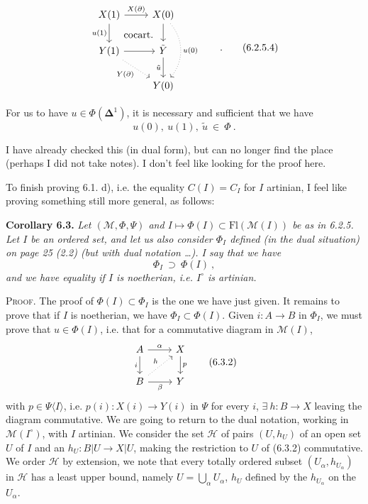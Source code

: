 \noindent{}
\[
\begin{tikzcd}
X(1) \arrow[r, "X(\partial)"] \arrow[d, "u(1)"'] \arrow[dr, phantom, "\text{cocart.}"] & X(0) \arrow[d] \arrow[dd, dotted, bend left=40, "u(0)"] \\
Y(1) \arrow[r] \arrow[dr, dotted, "Y(\partial)"'] & \tilde{Y} \arrow[d, "\tilde{u}"'] \\
 & Y(0)
\end{tikzcd}
\qquad .
\tag*{(6.2.5.4)}
\]

For us to have $u \in \Phi(\boldsymbol{\Delta}^1)$, it is necessary and sufficient that we have
\[
u(0),\ u(1),\ \tilde{u} \ \in\ \Phi\ .
\tag*{(6.2.5.5)}
\]

I have already checked this (in dual form), but can no longer find the place (perhaps I did not take notes). I don't feel like looking for the proof here.

To finish proving 6.1. d), i.e. the equality $C(I) = C_I$ for $I$ artinian, I feel like proving something still more general, as follows: %

\textbf{Corollary 6.3.} \textit{Let $(\mathcal{M}, \Phi, \Psi)$ and $I \longmapsto \Phi(I) \subset \mathrm{Fl}(\mathcal{M}(I))$ be as in \textup{6.2.5.} Let $I$ be an ordered set, and let us also consider $\Phi_I$ defined (in the dual situation) on page \textup{25 (2.2)} (but with dual notation \dots). I say that we have}
\[
\Phi_I \ \supset\ \Phi(I)\ ,
\tag*{(6.3.1)}
\]
\textit{and we have equality if $I$ is noetherian, i.e. $I^{\circ}$ is artinian.}

\textsc{Proof}. The proof of $\Phi(I) \subset \Phi_I$ is the one we have just given. It remains to prove that if $I$ is noetherian, we have $\Phi_I \subset \Phi(I)$. Given $i : A \longrightarrow B$ in $\Phi_I$, we must prove that $u \in \Phi(I)$, %
i.e. that for a commutative diagram in $\mathcal{M}(I)$,
\[
\begin{tikzcd}
A \arrow[r, "\alpha"] \arrow[d, "i"'] & X \arrow[d, "p"] \\
B \arrow[r, "\beta"'] \arrow[ur, dotted, "h"] & Y
\end{tikzcd}
\tag*{(6.3.2)}
\]
with $p \in \Psi\langle I\rangle$, i.e. $p(i) : X(i) \longrightarrow Y(i)$ in $\Psi$ for every $i$, $\exists\ h : B \longrightarrow X$ leaving the diagram commutative. We are going to return to the dual notation, working in $\mathcal{M}(I^{\circ})$, with $I$ artinian. We consider the set $\mathcal{H}$ of pairs %
$(U, h_U)$ of an open set $U$ of $I$ and an $h_U : B|U \longrightarrow X|U$, making the restriction to $U$ of (6.3.2) commutative. %
We order $\mathcal{H}$ by extension, we note that every totally ordered subset $(U_\alpha, h_{U_\alpha})$ in $\mathcal{H}$ has a least upper bound, namely $U = \bigcup_\alpha U_\alpha$, $h_U$ defined by the $h_{U_\alpha}$ on the $U_\alpha$.

